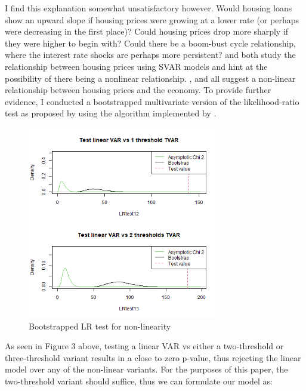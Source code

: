 \documentclass[12pt,a4paper]{article}
\begin{document}
\noindent I find this explanation somewhat unsatisfactory however. Would housing loans show an upward slope if housing prices were growing at a lower rate (or perhaps were decreasing in the first place)? Could housing prices drop more sharply if they were higher to begin with? Could there be a boom-bust cycle relationship, where the interest rate shocks are perhaps more persistent? \textcolor{blue}{\cite{jarocinski2008house}} and \textcolor{blue}{\cite{musso2011housing}} both study the relationship between housing prices using SVAR models and hint at the possibility of there being a nonlinear relationship. \textcolor{blue}{\cite{ahamada2013retrospective}}, \textcolor{blue}{\cite{ghodsi2017nonlinear}} and \textcolor{blue}{\cite{kang2014non}} all suggest a non-linear relationship between housing prices and the economy. To provide further evidence, I conducted a bootstrapped multivariate version of the \textcolor{blue}{\cite{hansen1999testing}}  likelihood-ratio test as proposed by \textcolor{blue}{\cite{lo2001threshold}} using the algorithm implemented by \textcolor{blue}{\cite{stigler2019}}. 
 \begin{center}
	\begin{figure}[h!]
		\includegraphics[width = 0.75\textwidth]{tvartest.png}
		\caption{Bootstrapped LR test for non-linearity}
	\end{figure}
\end{center}
As seen in Figure 3 above, testing a linear VAR vs either a two-threshold or three-threshold variant results in a close to zero p-value, thus rejecting the linear model over any of the non-linear variants. For the purposes of this paper, the two-threshold variant should suffice, thus we can formulate our model as: 
\end{document}
